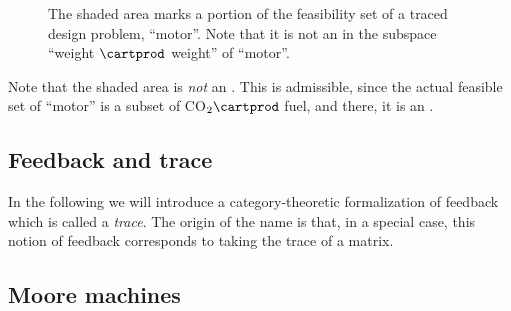 \begin{figure}[h!]
    \centering
    \caption{The shaded area marks a portion of the feasibility set of a traced design problem, ``motor''.
        Note that it is not an  in the subspace ``weight $\cartprod$ weight'' of ``motor''.
    }

    \label{fig:weightcarrier}

\end{figure}

Note that the shaded area is \emph{not} an .
This is admissible, since the actual feasible set of ``motor'' is a subset of CO$_2 \cartprod$ fuel, and there, it is an .

\subsection{Feedback and trace}

In the following we will introduce a category-theoretic formalization of feedback which is called a \emph{trace}.
The origin of the name is that, in a special case, this notion of feedback corresponds to taking the trace of a matrix.



\subsection{Moore machines}



